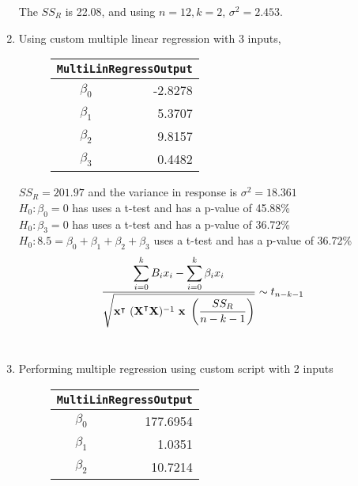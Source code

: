 \begin{enumerate}
The $ SS_R $ is 22.08, and using $ n = 12, k = 2 $, $ \sigma^2 = 2.453 $.\\

\item Using custom multiple linear regression with 3 inputs, \\

\begin{figure}[H]
	\centering
	\begin{tabular}{@{}rr@{}}
		\toprule
		\multicolumn{2}{c}{\texttt{MultiLinRegressOutput}} \\
		\midrule
		$\beta_0$ &          -2.8278 \\
		$\beta_1$ &           5.3707 \\
		$\beta_2$ &           9.8157 \\
		$\beta_3$ &           0.4482 \\
		\bottomrule
	\end{tabular}
	
\end{figure}

$ SS_R = 201.97 $ and the variance in response is $ \sigma^2 = 18.361 $\\
$ H_0 : \beta_0 = 0 $ has uses a t-test and has a p-value of 45.88\% \\
$ H_0 : \beta_3 = 0 $ has uses a t-test and has a p-value of 36.72\% \\
$ H_0 : 8.5 = \beta_0 + \beta_1 + \beta_2 + \beta_3 $ uses a t-test and has a p-value of 36.72\% \\

\begin{align}
	\frac{\displaystyle \sum\limits_{i = 0}^{k} B_i x_i - \sum\limits_{i = 0}^{k} \beta_i x_i}{\displaystyle \sqrt{\textbf{x}^\intercal \ (\textbf{X}^\intercal \textbf{X})^{-1}\ \textbf{x}\ \left(\frac{SS_R}{n-k-1}\right)}} &\sim t_{n-k-1}
\end{align}\\

\item  Performing multiple regression using custom script with 2 inputs\\

\begin{figure}[H]
	\centering
	\begin{tabular}{@{}rr@{}}
		\toprule
		\multicolumn{2}{c}{\texttt{MultiLinRegressOutput}} \\
		\midrule
		$\beta_0$ &         177.6954 \\
		$\beta_1$ &           1.0351 \\
		$\beta_2$ &          10.7214 \\
		\bottomrule
	\end{tabular}
\end{figure}


\end{enumerate}
